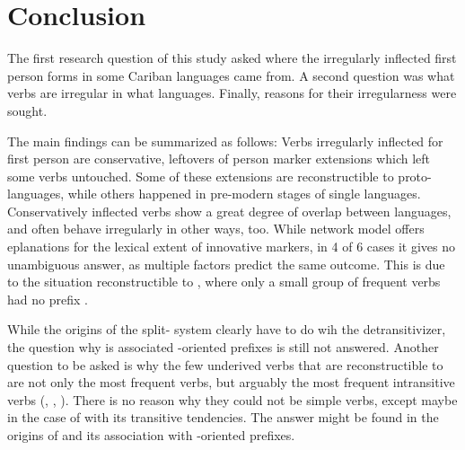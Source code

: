 \section{Conclusion}
\label{sec:discussion}
The first research question of this study asked where the irregularly inflected first person forms in some Cariban languages came from.
A second question was what verbs are irregular in what languages.
Finally, reasons for their irregularness were sought.

The main findings can be summarized as follows:
Verbs irregularly inflected for first person are conservative, leftovers of person marker extensions which left some verbs untouched.
Some of these extensions are reconstructible to proto-languages, while others happened in pre-modern stages of single languages.
Conservatively inflected verbs show a great degree of overlap between languages, and often behave irregularly in other ways, too.
While  network model offers eplanations for the lexical extent of innovative markers, in 4 of 6 cases it gives no unambiguous answer, as multiple factors predict the same outcome.
This is due to the situation reconstructible to \PC, where only a small group of frequent  verbs had no prefix \detrz.

While the origins of the split- system clearly have to do wih the detransitivizer, the question why \detrz is associated -oriented prefixes \parencite{meira2000split} is still not answered.
Another question to be asked is why the few underived  verbs that are reconstructible to \PC are not only the most frequent  verbs, but arguably the most frequent intransitive verbs (, , ).
There is no reason why they could not be simple  verbs, except maybe in the case of   with its transitive tendencies.
The answer might be found in the origins of \detrz and its association with -oriented prefixes.


